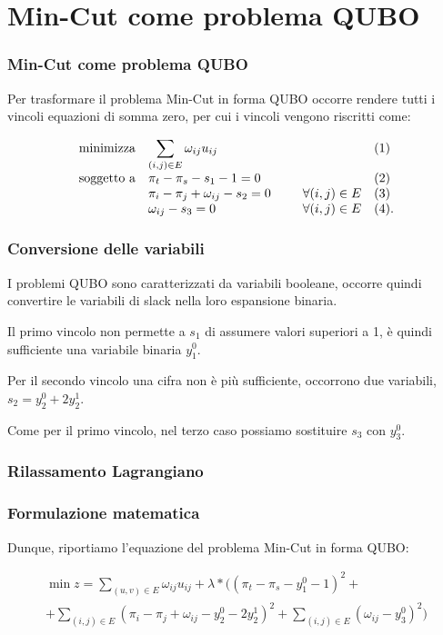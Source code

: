 \documentclass[10pt]{beamer}
\begin{document}
\section[Da CSP a QUBO]{Min-Cut come problema QUBO}
\begin{frame}
  \frametitle{Min-Cut come problema QUBO}

  Per trasformare il problema Min-Cut in forma QUBO occorre rendere tutti i vincoli equazioni di somma zero, per cui i vincoli vengono riscritti come:

  \begin{equation*}
    \begin{array}{ll@{}ll}
    \text{minimizza}    & \displaystyle\sum_{(i, j) \in E} \omega_{ij}u_{ij} &  &(1)\\
    \text{soggetto a}   & \displaystyle \pi_t - \pi_s - s_1 - 1 = 0 &   &(2)\\
                        & \displaystyle \pi_i - \pi_j  + \omega_{ij} - s_2 = 0\;\;\;\;\;\;\;\;\; & \forall (i,j) \in E & (3)\\
                        & \displaystyle \omega_{ij} - s_3 = 0 & \forall (i,j) \in E & (4).\\
  \end{array}
\end{equation*}

\end{frame}
\begin{frame}
  \frametitle{Conversione delle variabili}

  I problemi QUBO sono caratterizzati da variabili booleane, occorre quindi convertire le variabili di slack nella loro espansione binaria.

  Il primo vincolo non permette a $s_1$ di assumere valori superiori a 1, è quindi sufficiente una variabile binaria $y_1^0$.

  Per il secondo vincolo una cifra non è più sufficiente, occorrono due variabili, $s_2 = y_2^0 + 2y_2^1$.

  Come per il primo vincolo, nel terzo caso possiamo sostituire $s_3$ con $y_3^0$.

\end{frame}
\begin{frame}
  \frametitle{Rilassamento Lagrangiano}

  

\end{frame}
\begin{frame}
  \frametitle{Formulazione matematica}

  Dunque, riportiamo l'equazione del problema Min-Cut in forma QUBO:

  \begin{center}
    \begin{multline*}
        \min z = \sum_{(u, v) \in E} \omega_{ij}u_{ij} + \lambda*((\pi_t - \pi_s - y_1^0 - 1)^2 +
        \\+ \sum_{(i, j) \in E}(\pi_i - \pi_j + \omega_{ij} - y_2^0 - 2y_2^1)^2 + \sum_{(i, j) \in E}(\omega_{ij} - y_3^0)^2)
    \end{multline*}    
\end{center}

\end{frame}
\end{document}

